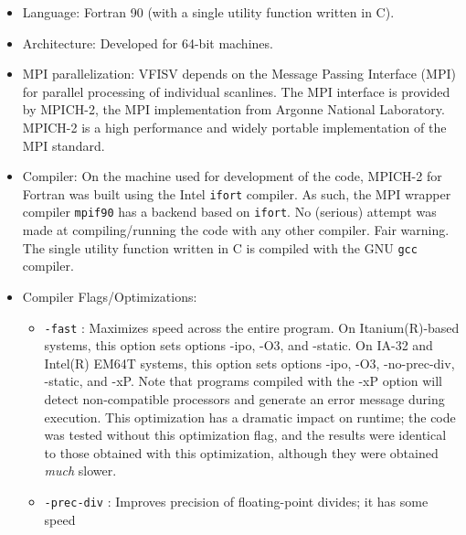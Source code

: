 \documentclass[11pt]{article}
\begin{document}
\begin{itemize}
  \renewcommand\labelitemi{\scriptsize$\blacksquare$}
  \item Language: Fortran 90 (with a single utility function written in C).
  \item Architecture: Developed for 64-bit machines.
  \item MPI parallelization: VFISV depends on the Message Passing Interface (MPI) for parallel
                             processing of individual scanlines.  The MPI interface
                             is provided by MPICH-2, the MPI implementation from Argonne National
                             Laboratory.  MPICH-2 is a high performance and widely portable implementation
                             of the MPI standard.
  \item Compiler: On the machine used for development of the code, MPICH-2 for Fortran was built using the
                  Intel \texttt{ifort} compiler.  As such, the MPI wrapper compiler \texttt{mpif90}
                  has a backend based on \texttt{ifort}.  No (serious) attempt was made at compiling/running
                  the code with any other compiler.  Fair warning.  The single utility function 
                  written in C is compiled with the GNU \texttt{gcc} compiler.
  \item Compiler Flags/Optimizations: 
        \begin{itemize}
        \renewcommand\labelitemii{\textbullet}
          \item \texttt{-fast} : Maximizes speed across the entire program.  On Itanium(R)-based
                                 systems, this option sets options -ipo, -O3, and  -static.   On
                                 IA-32  and  Intel(R)  EM64T  systems,  this option sets options
                                 -ipo, -O3, -no-prec-div, -static, and -xP.  Note that programs
                                 compiled with the  -xP  option  will  detect non-compatible 
                                 processors and generate an error message during execution.  This 
                                 optimization  has a dramatic impact on runtime; the code was tested
                                 without this optimization flag, and the results were identical to
                                 those obtained with this optimization, although they were obtained
                                 \textit{much} slower.
          \item \texttt{-prec-div} : Improves precision of floating-point divides; it has some speed

\end{itemize}
\end{itemize}
\end{document}
